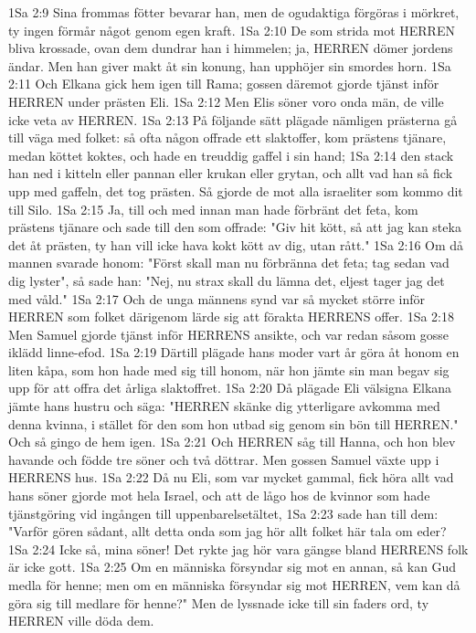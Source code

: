1Sa 2:9  Sina frommas fötter bevarar han, men de ogudaktiga förgöras i mörkret, ty ingen förmår något genom egen kraft.
1Sa 2:10  De som strida mot HERREN bliva krossade, ovan dem dundrar han i himmelen; ja, HERREN dömer jordens ändar. Men han giver makt åt sin konung, han upphöjer sin smordes horn.
1Sa 2:11  Och Elkana gick hem igen till Rama; gossen däremot gjorde tjänst inför HERREN under prästen Eli.
1Sa 2:12  Men Elis söner voro onda män, de ville icke veta av HERREN.
1Sa 2:13  På följande sätt plägade nämligen prästerna gå till väga med folket: så ofta någon offrade ett slaktoffer, kom prästens tjänare, medan köttet koktes, och hade en treuddig gaffel i sin hand;
1Sa 2:14  den stack han ned i kitteln eller pannan eller krukan eller grytan, och allt vad han så fick upp med gaffeln, det tog prästen. Så gjorde de mot alla israeliter som kommo dit till Silo.
1Sa 2:15  Ja, till och med innan man hade förbränt det feta, kom prästens tjänare och sade till den som offrade: "Giv hit kött, så att jag kan steka det åt prästen, ty han vill icke hava kokt kött av dig, utan rått."
1Sa 2:16  Om då mannen svarade honom: "Först skall man nu förbränna det feta; tag sedan vad dig lyster", så sade han: "Nej, nu strax skall du lämna det, eljest tager jag det med våld."
1Sa 2:17  Och de unga männens synd var så mycket större inför HERREN som folket därigenom lärde sig att förakta HERRENS offer.
1Sa 2:18  Men Samuel gjorde tjänst inför HERRENS ansikte, och var redan såsom gosse iklädd linne-efod.
1Sa 2:19  Därtill plägade hans moder vart år göra åt honom en liten kåpa, som hon hade med sig till honom, när hon jämte sin man begav sig upp för att offra det årliga slaktoffret.
1Sa 2:20  Då plägade Eli välsigna Elkana jämte hans hustru och säga: "HERREN skänke dig ytterligare avkomma med denna kvinna, i stället för den som hon utbad sig genom sin bön till HERREN." Och så gingo de hem igen.
1Sa 2:21  Och HERREN såg till Hanna, och hon blev havande och födde tre söner och två döttrar. Men gossen Samuel växte upp i HERRENS hus.
1Sa 2:22  Då nu Eli, som var mycket gammal, fick höra allt vad hans söner gjorde mot hela Israel, och att de lågo hos de kvinnor som hade tjänstgöring vid ingången till uppenbarelsetältet,
1Sa 2:23  sade han till dem: "Varför gören sådant, allt detta onda som jag hör allt folket här tala om eder?
1Sa 2:24  Icke så, mina söner! Det rykte jag hör vara gängse bland HERRENS folk är icke gott.
1Sa 2:25  Om en människa försyndar sig mot en annan, så kan Gud medla för henne; men om en människa försyndar sig mot HERREN, vem kan då göra sig till medlare för henne?" Men de lyssnade icke till sin faders ord, ty HERREN ville döda dem.
